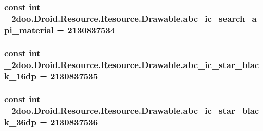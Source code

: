 \hypertarget{class__2doo_1_1_droid_1_1_resource_1_1_drawable_4b4c16690bfa331f6273c32c69a787f4}{
\subsubsection[{abc\_\-ic\_\-search\_\-api\_\-material}]{\setlength{\rightskip}{0pt plus 5cm}const int \_\-2doo.Droid.Resource.Resource.Drawable.abc\_\-ic\_\-search\_\-api\_\-material = 2130837534}}
\label{class__2doo_1_1_droid_1_1_resource_1_1_drawable_4b4c16690bfa331f6273c32c69a787f4}


\hypertarget{class__2doo_1_1_droid_1_1_resource_1_1_drawable_5f64e84de491857704a5c56ae46fc011}{
\subsubsection[{abc\_\-ic\_\-star\_\-black\_\-16dp}]{\setlength{\rightskip}{0pt plus 5cm}const int \_\-2doo.Droid.Resource.Resource.Drawable.abc\_\-ic\_\-star\_\-black\_\-16dp = 2130837535}}
\label{class__2doo_1_1_droid_1_1_resource_1_1_drawable_5f64e84de491857704a5c56ae46fc011}


\hypertarget{class__2doo_1_1_droid_1_1_resource_1_1_drawable_3fbc4bc8aecdcdf3924b74353e7f441f}{
\subsubsection[{abc\_\-ic\_\-star\_\-black\_\-36dp}]{\setlength{\rightskip}{0pt plus 5cm}const int \_\-2doo.Droid.Resource.Resource.Drawable.abc\_\-ic\_\-star\_\-black\_\-36dp = 2130837536}}
\label{class__2doo_1_1_droid_1_1_resource_1_1_drawable_3fbc4bc8aecdcdf3924b74353e7f441f}


